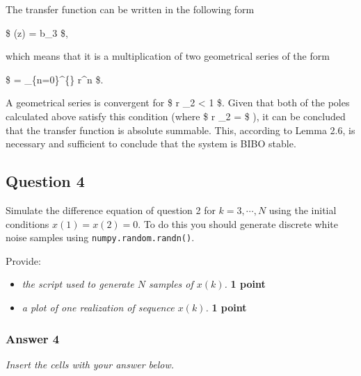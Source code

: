 \documentclass[11pt]{article}
\providecommand{\tightlist}{%
      \setlength{\itemsep}{0pt}\setlength{\parskip}{0pt}}
\begin{document}
    The transfer function can be written in the following form

\$ (z) = b\_3 
\$,

which means that it is a multiplication of two geometrical series of the
form

\$  = \sum\_\{n=0\}\^{}\{\infty\} r\^{}n \$.

A geometrical series is convergent for \$ \textbar{} r \textbar\_2
\textless{} 1 \$. Given that both of the poles calculated above satisfy
this condition (where \$ \textbar{} r \textbar\_2 =
 \$ ), it can be concluded that the transfer
function is absolute summable. This, according to Lemma 2.6, is
necessary and sufficient to conclude that the system is BIBO stable.

    \hypertarget{question-4}{%
\subsection{Question 4}\label{question-4}}

Simulate the difference equation of question 2 for \(k = 3,\cdots ,N\)
using the initial conditions \(x(1) = x(2) = 0\). To do this you should
generate discrete white noise samples using
\texttt{numpy.random.randn()}.

Provide:

\begin{itemize}
\tightlist
\item
  \emph{the script used to generate \(N\) samples of \(x(k)\).}
  \textbf{1 point}
\item
  \emph{a plot of one realization of sequence \(x(k)\).} \textbf{1
  point}
\end{itemize}

    \hypertarget{answer-4}{%
\subsubsection{Answer 4}\label{answer-4}}

\emph{Insert the cells with your answer below.}
\end{document}

